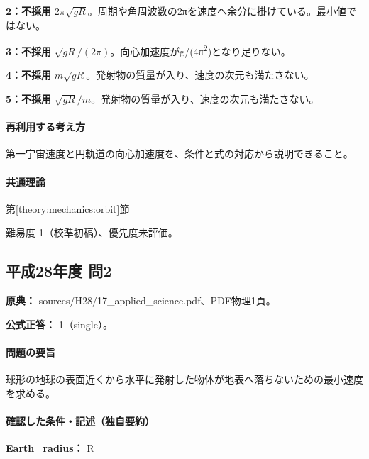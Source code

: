 \noindent\textbf{2：不採用} \(2\pi\sqrt{gR}\)。周期や角周波数の2πを速度へ余分に掛けている。最小値ではない。\par

\noindent\textbf{3：不採用} \(\sqrt{gR}/(2\pi)\)。向心加速度がg/(4π\textsuperscript{2})となり足りない。\par

\noindent\textbf{4：不採用} \(m\sqrt{gR}\)。発射物の質量が入り、速度の次元も満たさない。\par

\noindent\textbf{5：不採用} \(\sqrt{gR}/m\)。発射物の質量が入り、速度の次元も満たさない。\par

\paragraph{再利用する考え方} 第一宇宙速度と円軌道の向心加速度を、条件と式の対応から説明できること。

\paragraph{共通理論} \hyperref[theory:mechanics:orbit]{第\ref*{theory:mechanics:orbit}節}

\par 難易度 1（校準初稿）、優先度未評価。

\subsection{平成28年度 問2}
\label{q:h28-reg-applied-02}

\noindent\textbf{原典：} sources/H28/17\_applied\_science.pdf、PDF物理1頁。

\textbf{公式正答：} 1（single）。

\paragraph{問題の要旨} 球形の地球の表面近くから水平に発射した物体が地表へ落ちないための最小速度を求める。

\paragraph{確認した条件・記述（独自要約）}\mbox{}\par

\noindent\textbf{Earth\_radius：} R\par

